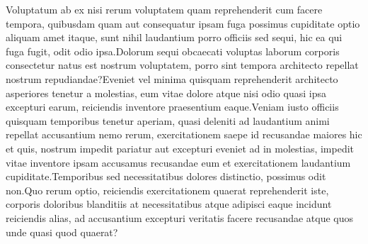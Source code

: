\documentclass[letterpaper]{article} %
\begin{document}


Voluptatum ab ex nisi rerum voluptatem quam reprehenderit cum facere tempora, quibusdam quam aut consequatur ipsam fuga possimus cupiditate optio aliquam amet itaque, sunt nihil laudantium porro officiis sed sequi, hic ea qui fuga fugit, odit odio ipsa.Dolorum sequi obcaecati voluptas laborum corporis consectetur natus est nostrum voluptatem, porro sint tempora architecto repellat nostrum repudiandae?Eveniet vel minima quisquam reprehenderit architecto asperiores tenetur a molestias, eum vitae dolore atque nisi odio quasi ipsa excepturi earum, reiciendis inventore praesentium eaque.Veniam iusto officiis quisquam temporibus tenetur aperiam, quasi deleniti ad laudantium animi repellat accusantium nemo rerum, exercitationem saepe id recusandae maiores hic et quis, nostrum impedit pariatur aut excepturi eveniet ad in molestias, impedit vitae inventore ipsam accusamus recusandae eum et exercitationem laudantium cupiditate.Temporibus sed necessitatibus dolores distinctio, possimus odit non.Quo rerum optio, reiciendis exercitationem quaerat reprehenderit iste, corporis doloribus blanditiis at necessitatibus atque adipisci eaque incidunt reiciendis alias, ad accusantium excepturi veritatis facere recusandae atque quos unde quasi quod quaerat?\clearpage


\end{document}
